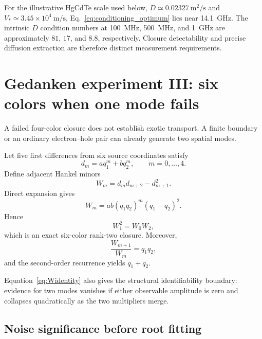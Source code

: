 \documentclass[11pt]{article}
\begin{document}
For the illustrative HgCdTe scale used below, $D\simeq0.02327~\mathrm{m^2/s}$ and $V_*\simeq3.45\times10^4~\mathrm{m/s}$, Eq.~\eqref{eq:conditioning_optimum} lies near \SI{14.1}{GHz}. The intrinsic $D$ condition numbers at \SI{100}{MHz}, \SI{500}{MHz}, and \SI{1}{GHz} are approximately $81$, $17$, and $8.8$, respectively. Closure detectability and precise diffusion extraction are therefore distinct measurement requirements.

\section{Gedanken experiment III: six colors when one mode fails}

A failed four-color closure does not establish exotic transport. A finite boundary or an ordinary electron--hole pair can already generate two spatial modes.

Let five first differences from six source coordinates satisfy
\begin{equation}
d_m=a q_1^m+b q_2^m,
\qquad m=0,\ldots,4.
\label{eq:twomode}
\end{equation}
Define adjacent Hankel minors
\begin{equation}
W_m=d_md_{m+2}-d_{m+1}^2.
\end{equation}
Direct expansion gives
\begin{equation}
\boxed{W_m=ab(q_1q_2)^m(q_1-q_2)^2.}
\label{eq:Widentity}
\end{equation}
Hence
\begin{equation}
\boxed{W_1^2=W_0W_2,}
\label{eq:rank2closure}
\end{equation}
which is an exact six-color rank-two closure. Moreover,
\begin{equation}
\frac{W_{m+1}}{W_m}=q_1q_2,
\end{equation}
and the second-order recurrence yields $q_1+q_2$.

Equation~\eqref{eq:Widentity} also gives the structural identifiability boundary: evidence for two modes vanishes if either observable amplitude is zero and collapses quadratically as the two multipliers merge.

\subsection{Noise significance before root fitting}
\end{document}

